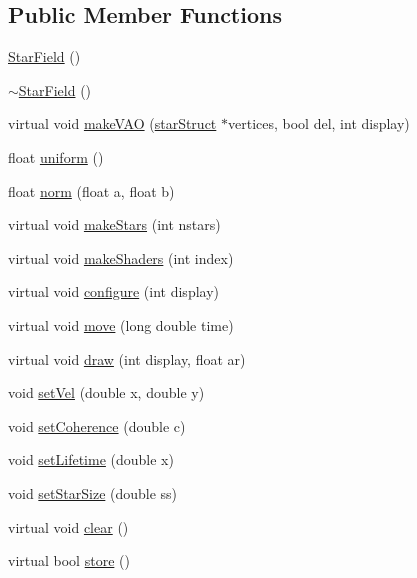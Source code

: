 \subsection*{Public Member Functions}
\begin{DoxyCompactItemize}
\item 
\hyperlink{classStarField_ab2bd0288efac030b0f4dabe9f07f5e4e}{Star\-Field} ()
\item 
\hyperlink{classStarField_a01b259387dc4a83272901110c30d4cb2}{$\sim$\-Star\-Field} ()
\item 
virtual void \hyperlink{classStarField_afb99580b3907e4c271040f332262fb1c}{make\-V\-A\-O} (\hyperlink{structstarStruct}{star\-Struct} $\ast$vertices, bool del, int display)
\item 
float \hyperlink{classStarField_a69aeb2f24c09fbb2cccb79e5135d4bc8}{uniform} ()
\item 
float \hyperlink{classStarField_ad2e8a935f3c810330bfb61d7404b986e}{norm} (float a, float b)
\item 
virtual void \hyperlink{classStarField_ae6b25b3827440dedf5836070205d4c6d}{make\-Stars} (int nstars)
\item 
virtual void \hyperlink{classStarField_a72ab192923ffe6939fceb2166e05c82d}{make\-Shaders} (int index)
\item 
virtual void \hyperlink{classStarField_a0d5f438a2628b90e0d7ccc5a8683225b}{configure} (int display)
\item 
virtual void \hyperlink{classStarField_ac3e35d838577ed7610bdaf933ef5b99d}{move} (long double time)
\item 
virtual void \hyperlink{classStarField_aeaf743e6d1d4a8a6918152c40bd618c0}{draw} (int display, float ar)
\item 
void \hyperlink{classStarField_a01b9571dbc4f28f0a75b12790e11cd8e}{set\-Vel} (double x, double y)
\item 
void \hyperlink{classStarField_adc2425bc84abe280cbe53229f7b167b2}{set\-Coherence} (double c)
\item 
void \hyperlink{classStarField_a641c0759d85fbb2f8adbbf6e7a2e636b}{set\-Lifetime} (double x)
\item 
void \hyperlink{classStarField_acf8cd47946ce81cd7256d6f162c4b67e}{set\-Star\-Size} (double ss)
\item 
virtual void \hyperlink{classStarField_a1a97b6133ae0177f6eb8028470c28765}{clear} ()
\item 
virtual bool \hyperlink{classStarField_aa8411004d05d05ac3e0f8d10bfa1949e}{store} ()
\item 

\end{DoxyCompactItemize}
